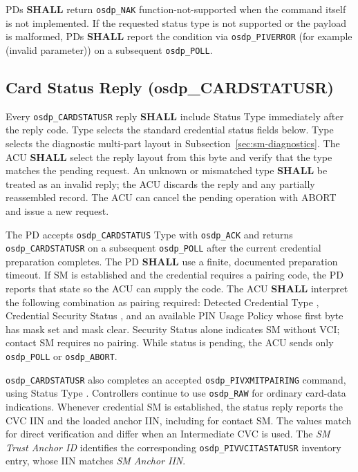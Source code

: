 

PDs \textbf{SHALL} return \texttt{osdp\_NAK} function-not-supported when the command itself is not implemented. If the requested status type is not supported or the payload is malformed, PDs \textbf{SHALL} report the condition via \texttt{osdp\_PIVERROR} (for example  (invalid parameter)) on a subsequent \texttt{osdp\_POLL}.

\subsection{Card Status Reply (osdp\_CARDSTATUSR)}

Every \texttt{osdp\_CARDSTATUSR} reply \textbf{SHALL} include Status Type
immediately after the reply code. Type  selects the standard
credential status fields below. Type  selects the diagnostic
multi-part layout in Subsection~\ref{sec:sm-diagnostics}.
The ACU \textbf{SHALL} select the reply layout from this byte and verify
that the type matches the pending request. An unknown or mismatched type
\textbf{SHALL} be treated as an invalid reply; the ACU discards the reply
and any partially reassembled record. The ACU can cancel the pending
operation with ABORT and issue a new request.

The PD accepts \texttt{osdp\_CARDSTATUS} Type  with \texttt{osdp\_ACK} and returns
\texttt{osdp\_CARDSTATUSR} on a subsequent \texttt{osdp\_POLL} after the current
credential preparation completes. The PD \textbf{SHALL} use a finite, documented
preparation timeout. If SM is established and the credential requires a pairing code,
the PD reports that state so the ACU can supply the code. The ACU \textbf{SHALL}
interpret the following combination as pairing required: Detected Credential
Type , Credential Security Status , and an available
PIN Usage Policy whose first byte has mask  set and mask
 clear. Security Status  alone indicates SM without VCI;
contact SM requires no pairing. While status is pending,
the ACU sends only \texttt{osdp\_POLL} or \texttt{osdp\_ABORT}.

\texttt{osdp\_CARDSTATUSR} also completes an accepted
\texttt{osdp\_PIVXMITPAIRING} command, using Status Type .
Controllers continue to use \texttt{osdp\_RAW} for ordinary card-data indications.
Whenever credential SM is established, the status reply reports the CVC IIN and
the loaded anchor IIN, including for contact SM. The values match for direct
verification and differ when an Intermediate CVC is used. The \emph{SM Trust
Anchor ID} identifies the corresponding \texttt{osdp\_PIVVCITASTATUSR} inventory
entry, whose IIN matches \emph{SM Anchor IIN}.

